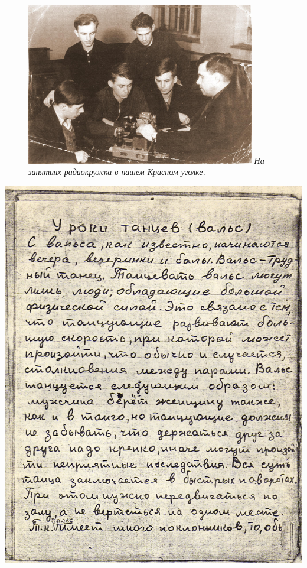 \begin{figure}[h!]
    \begin{minipage}{100mm}
    \includegraphics[width=100mm]{inc/49/1}
    \textit{\footnotesize{На занятиях радиокружка в нашем Красном уголке.}}
    \end{minipage}
\end{figure}

\newpage


\noindent
\includegraphics[width=\textwidth]{inc/Vynd/Vynd012}

